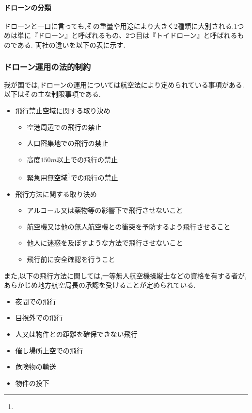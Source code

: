 \documentclass{article}[jsarticle]
\begin{document}
\paragraph{ドローンの分類}
ドローンと一口に言っても,その重量や用途により大きく2種類に大別される.1つめは単に『ドローン』と呼ばれるもの、2つ目は『トイドローン』と呼ばれるものである.
両社の違いを以下の表に示す.
\subsubsection{ドローン運用の法的制約}
我が国では,ドローンの運用については航空法により定められている事項がある.以下はその主な制限事項である.
\begin{itemize}
    \item 飛行禁止空域に関する取り決め
    \begin{itemize}
        \item 空港周辺での飛行の禁止
        \item 人口密集地での飛行の禁止
        \item 高度$150m$以上での飛行の禁止
        \item 緊急用無空域\footnote{}での飛行の禁止
    \end{itemize}
    \item 飛行方法に関する取り決め
    \begin{itemize}
        \item アルコール又は薬物等の影響下で飛行させないこと
        \item 航空機又は他の無人航空機との衝突を予防するよう飛行させること
        \item 他人に迷惑を及ぼすような方法で飛行させないこと
        \item 飛行前に安全確認を行うこと 
    \end{itemize}
\end{itemize}
また,以下の飛行方法に関しては,一等無人航空機操縦士などの資格を有する者が,あらかじめ地方航空局長の承認を受けることが定められている.
\begin{itemize}
    \item 夜間での飛行
    \item 目視外での飛行
    \item 人又は物件との距離を確保できない飛行
    \item 催し場所上空での飛行
    \item 危険物の輸送
    \item 物件の投下
\end{itemize}
\end{document}

